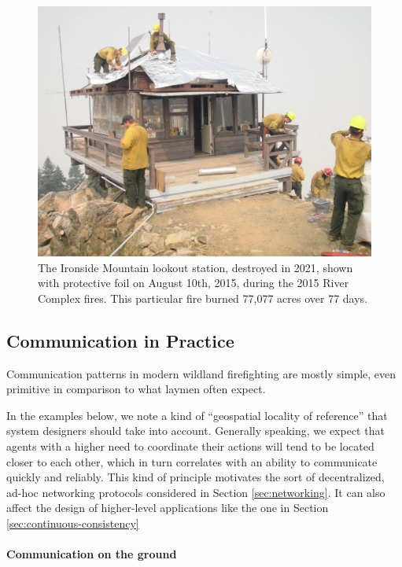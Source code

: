 \documentclass[]             %
{NASA}                       %
\theoremstyle{definition}
\begin{document}
\begin{figure}[h]
\centering
\includegraphics[scale=0.085]{images/ironside.jpg}
\caption{The Ironside Mountain lookout station, destroyed in 2021, shown with protective foil on August 10th, 2015, during the 2015 River Complex fires. This particular fire burned 77,077 acres over 77 days.}
\end{figure}

\hypertarget{communication-in-practice}{%
\subsection{Communication in Practice}\label{communication-in-practice}}

Communication patterns in modern wildland firefighting are mostly
simple, even primitive in comparison to what laymen often expect.

In the examples below, we note a kind of ``geospatial locality of
reference'' that system designers should take into account. Generally
speaking, we expect that agents with a higher need to coordinate their
actions will tend to be located closer to each other, which in turn
correlates with an ability to communicate quickly and reliably. This
kind of principle motivates the sort of decentralized, ad-hoc networking
protocols considered in Section \ref{sec:networking}. It can also affect
the design of higher-level applications like the one in Section
\ref{sec:continuous-consistency}

\paragraph{Communication on the ground}
\end{document}
